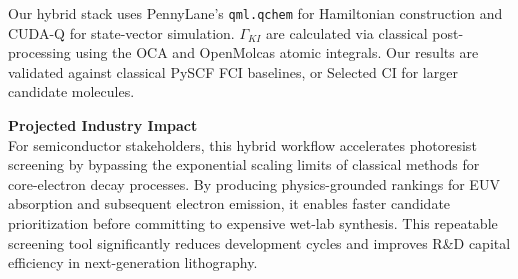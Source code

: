 \documentclass[11pt]{article}
\begin{document}
Our hybrid stack uses PennyLane's \verb|qml.qchem| for Hamiltonian construction and CUDA-Q for state-vector simulation. $\Gamma_{KI}$ are calculated via classical post-processing using the OCA and OpenMolcas atomic integrals. Our results are validated against classical PySCF FCI baselines, or Selected CI for larger candidate molecules.

\noindent\textbf{Projected Industry Impact}\\
For semiconductor stakeholders, this hybrid workflow accelerates photoresist screening by bypassing the exponential scaling limits of classical methods for core-electron decay processes. By producing physics-grounded rankings for EUV absorption and subsequent electron emission, it enables faster candidate prioritization before committing to expensive wet-lab synthesis. This repeatable screening tool significantly reduces development cycles and improves R\&D capital efficiency in next-generation lithography.
\end{document}
